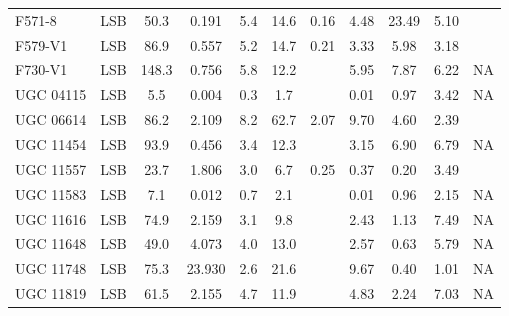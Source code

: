 \documentclass[preprint,aps]{revtex4}
\begin{document}
\begin{table}
\begin{tabular}{l c c c c c c c c c c}
\\
F571-8 & LSB & \phantom{0}50.3 &   \phantom{0}0.191   & 5.4 & 14.6 & 0.16& \phantom{0}4.48 &
 23.49& 5.10 & \cite{McGaugh2001} \cite{deBlok1996} \cite{deBlok1997} \cite{deBlok1996}     
  \\
F579-V1 & LSB & \phantom{0}86.9&   \phantom{0}0.557   & 5.2 & 14.7 & 0.21 & \phantom{0}3.33 &
\phantom{0}5.98 &  3.18 & \cite{McGaugh2001} \cite{deBlok1996} \cite{deBlok1997} \cite{deBlok1996}    
\\
F730-V1 &LSB & 148.3 &    \phantom{0}0.756 & 5.8 & 12.2 & ~~ & \phantom{0}5.95 & \phantom{0}7.87 & 6.22 & \cite{McGaugh2001} \cite{Kim2007} \cite{Kim2007} NA   
 \\
UGC 04115& LSB & \phantom{00}5.5 &  \phantom{0}0.004    & 0.3 & \phantom{0}1.7 & ~~ & \phantom{0}0.01 & \phantom{0}0.97 & 3.42&\cite{McGaugh2001} \cite{deBlok2001} \cite{Bazarra2001} NA 
\\
UGC 06614 &LSB&\phantom{0}86.2 &    \phantom{0}2.109 & 8.2 & 62.7 & 2.07 & \phantom{0}9.70 &\phantom{0}4.60& 2.39 &\cite{McGaugh2001} \cite{deBlok2001} \cite{vanderHulst1993} \cite{vanderHulst1993} 
\\
UGC 11454 & LSB & \phantom{0}93.9 &   \phantom{0}0.456   & 3.4 & 12.3 &~~ & \phantom{0}3.15 & \phantom{0}6.90& 6.79&     \cite{McGaugh2001} \cite{deBlok2001} \cite{Kim2007} NA   
\\
UGC 11557 & LSB & \phantom{0}23.7 &   \phantom{0}1.806   & 3.0 & \phantom{0}6.7 &0.25 &\phantom{0}0.37& \phantom{0}0.20& 3.49 &  \cite{McGaugh2001} \cite{deBlok2001} \cite{Swaters2002a} \cite{Swaters2002a}    
\\
UGC 11583&LSB & \phantom{00}7.1 &  \phantom{0}0.012    & 0.7 & \phantom{0}2.1 & ~~
&\phantom{0}0.01 & \phantom{0}0.96 & 2.15&    \cite{McGaugh2001} \cite{deBlok2001} \cite{Kim2007} NA     
 \\
UGC 11616 &LSB&\phantom{0}74.9 &   \phantom{0}2.159   &3.1 & \phantom{0}9.8 & ~~ & \phantom{0}2.43 &\phantom{0}1.13 & 7.49 &     \cite{McGaugh2001} \cite{deBlok2001} \cite{Kim2007} NA  
\\
UGC 11648 &LSB & \phantom{0}49.0 &  \phantom{0}4.073    &4.0 &13.0 &~~ &\phantom{0}2.57 &\phantom{0}0.63 & 5.79&    \cite{McGaugh2001} \cite{deBlok2001} \cite{Kim2007} NA    
\\
UGC 11748 &LSB &\phantom{0}75.3 &  23.930  & 2.6 & 21.6 & ~~ &\phantom{0}9.67 &\phantom{0}0.40 &1.01 &     \cite{McGaugh2001} \cite{deBlok2001} \cite{Kim2007} NA  
\\
UGC 11819 &LSB &\phantom{0}61.5 &    \phantom{0}2.155  & 4.7 & 11.9 & ~~ &\phantom{0}4.83 & \phantom{0}2.24& 7.03 &   \cite{McGaugh2001} \cite{deBlok2001} \cite{Kim2007} NA    
\\
\hline
\end{tabular}
\label{table:lsb21}
\end{table}
\end{document}
